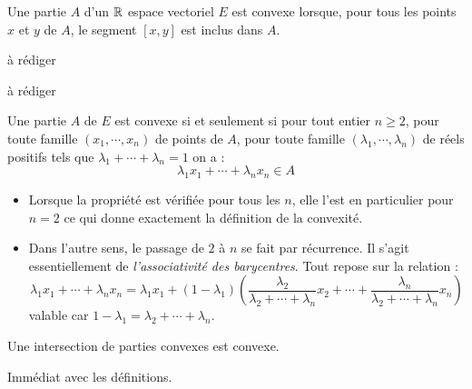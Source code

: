\begin{defi}
Une partie $A$ d'un $\mathbb{R}$ espace vectoriel $E$ est convexe lorsque, pour tous les points $x$ et $y$ de $A$, le segment $[x,y]$ est inclus dans $A$. 
\end{defi}
\begin{prop}
 à rédiger
\end{prop}
\begin{demo}
 à rédiger
\end{demo}

\begin{prop}
 Une partie $A$ de $E$ est convexe si et seulement si pour tout entier $n\geq2$, pour toute famille $(x_1,\cdots,x_n)$ de points de $A$, pour toute famille $(\lambda_1,\cdots,\lambda_n)$ de réels positifs tels que $\lambda_1 + \cdots +\lambda_n =1$ on a :
\begin{displaymath}
 \lambda_1 x_1+ \cdots +\lambda_n x_n \in A
\end{displaymath}
\end{prop}
\begin{demo}
 \begin{itemize}
 \item Lorsque la propriété est vérifiée pour tous les $n$, elle l'est en particulier pour $n=2$ ce qui donne exactement la définition de la convexité.
 \item Dans l'autre sens, le passage de $2$ à $n$ se fait par récurrence. Il s'agit essentiellement de \emph{l'associativité des barycentres}. Tout repose sur la relation :
\begin{displaymath}
 \lambda_1 x_1+ \cdots +\lambda_n x_n =
  \lambda_1 x_1 +(1-\lambda_1)\left(\dfrac{\lambda_2}{\lambda_2 + \cdots + \lambda_n}x_2 + \cdots + \dfrac{\lambda_n}{\lambda_2 + \cdots + \lambda_n}x_n \right) 
\end{displaymath}
valable car $1-\lambda_1 = \lambda_2 + \cdots + \lambda_n$.
\end{itemize}

\end{demo}

\begin{prop}
 Une intersection de parties convexes est convexe.
\end{prop}
\begin{demo}
 Immédiat avec les définitions.
\end{demo}

